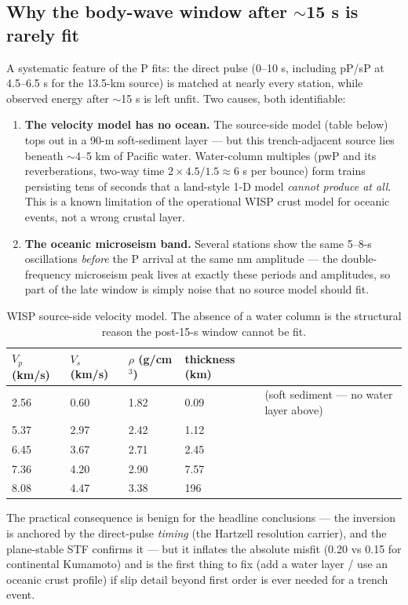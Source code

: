 \documentclass[11pt]{article}
\begin{document}
\subsection*{Why the body-wave window after $\sim$15 s is rarely fit}
A systematic feature of the P fits: the direct pulse (0--10 s, including pP/sP at 4.5--6.5 s
for the 13.5-km source) is matched at nearly every station, while observed energy after
$\sim$15 s is left unfit. Two causes, both identifiable:
\begin{enumerate}
\item \textbf{The velocity model has no ocean.} The source-side model (table below) tops out
in a 90-m soft-sediment layer --- but this trench-adjacent source lies beneath $\sim$4--5 km
of Pacific water. Water-column multiples (pwP and its reverberations, two-way time
$2\times4.5/1.5\approx6$ s per bounce) form trains persisting tens of seconds that a
land-style 1-D model \emph{cannot produce at all}. This is a known limitation of the
operational WISP crust model for oceanic events, not a wrong crustal layer.
\item \textbf{The oceanic microseism band.} Several stations show the same 5--8-s
oscillations \emph{before} the P arrival at the same nm amplitude --- the double-frequency
microseism peak lives at exactly these periods and amplitudes, so part of the late window is
simply noise that no source model should fit.
\end{enumerate}
\begin{table}[H]\centering\small
\begin{tabular}{lllll}
\toprule
$V_p$ (km/s) & $V_s$ (km/s) & $\rho$ (g/cm$^3$) & thickness (km) & \\
\midrule
2.56 & 0.60 & 1.82 & 0.09 & (soft sediment --- no water layer above) \\
5.37 & 2.97 & 2.42 & 1.12 & \\
6.45 & 3.67 & 2.71 & 2.45 & \\
7.36 & 4.20 & 2.90 & 7.57 & \\
8.08 & 4.47 & 3.38 & 196 & \\
\bottomrule
\end{tabular}
\caption{WISP source-side velocity model. The absence of a water column is the structural
reason the post-15-s window cannot be fit.}
\end{table}
The practical consequence is benign for the headline conclusions --- the inversion is anchored
by the direct-pulse \emph{timing} (the Hartzell resolution carrier), and the plane-stable STF
confirms it --- but it inflates the absolute misfit (0.20 vs 0.15 for continental Kumamoto)
and is the first thing to fix (add a water layer / use an oceanic crust profile) if slip
detail beyond first order is ever needed for a trench event.
\end{document}
